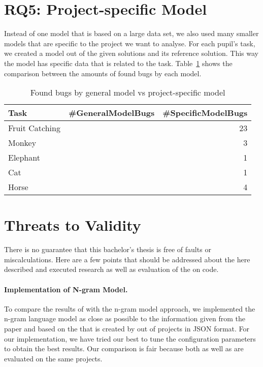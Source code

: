 

\section{RQ5: Project-specific Model}\label{sec:project-specific}
Instead of one model that is based on a large data set, we also used many smaller models that are specific to the project we want to analyse. For each pupil's task, we created a model out of the given solutions and its reference solution. This way the model has specific data that is related to the task. Table~\ref{tab:amountbugs} shows the comparison between the amounts of found bugs by each model.

\begin{table}[H]
    \centering
    \caption[Found bugs by general model vs project-specific model]{\label{tab:amountbugs}Found bugs by general model vs project-specific model}
    \begin{tabular}{lrr}
        \toprule
        Task & \#GeneralModelBugs & \#SpecificModelBugs \\
        \midrule
        Fruit Catching  & & 23  \\
        Monkey  & & 3\\
        Elephant  & & 1  \\
        Cat  & & 1 \\
        Horse & & 4 \\
        \bottomrule
    \end{tabular}
\end{table}

\section{Threats to Validity}\label{sec:threats-to-validity}
There is no guarantee that this bachelor's thesis is free of faults or miscalculations. Here are a few points that should be addressed about the here described and executed research as well as evaluation of the \ngram{} on \scratch{} code.

\paragraph{Implementation of N-gram Model.}
To compare the results of \litterbox{} with the n-gram model approach, we implemented the n-gram language model as close as possible to the information given from the \bugram{}~\cite{bugram} paper and based on the \AST{} that is created by \litterbox{} out of \scratch{} projects in JSON format. For our implementation, we have tried our best to tune the configuration parameters to obtain the best results. Our comparison is fair because both \litterbox{} as well as \ngram{} are evaluated on the same projects.

